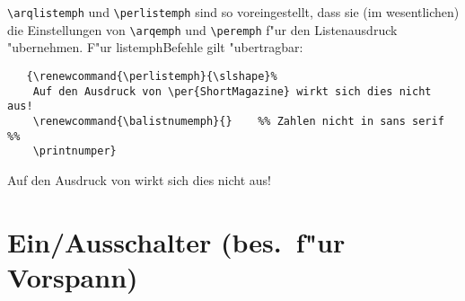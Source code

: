 \documentclass[12pt,a4paper]{article}
\begin{document}
\vspace{.075ex}
\verb|\arqlistemph| und \verb|\perlistemph| sind so voreingestellt, dass 
sie (im wesentlichen) die Einstellungen von \verb|\arqemph| und 
\verb|\peremph| f"ur den Listenausdruck "ubernehmen. 
F"ur listemph\hy Befehle gilt "ubertragbar:

\vspace{.25ex}
{\footnotesize
\begin{verbatim}
   {\renewcommand{\perlistemph}{\slshape}%
    Auf den Ausdruck von \per{ShortMagazine} wirkt sich dies nicht aus!
    \renewcommand{\balistnumemph}{}    %% Zahlen nicht in sans serif %%
    \printnumper}
\end{verbatim}}

\vspace{.25ex}
{\renewcommand{\perlistemph}{\slshape}%
 \hspace{.2em}Auf den Ausdruck von  wirkt sich dies nicht aus!
 \renewcommand{\balistnumemph}{}    %
\vspace{-1.75ex}
 \printnumper}


\newcommand{\mynwarrow}{\hspace{1cm}\raisebox{1.1ex}{{\footnotesize$\nwarrow$}}\hspace{.3em}}%
\newpage
\section{\BibArts\hy Ein\fhy\ko/\ko\ko Ausschalter (bes.\ \ko f"ur \ko\ko Vorspann)}\label{Sect15}

\vspace{1ex}\
\end{document}
